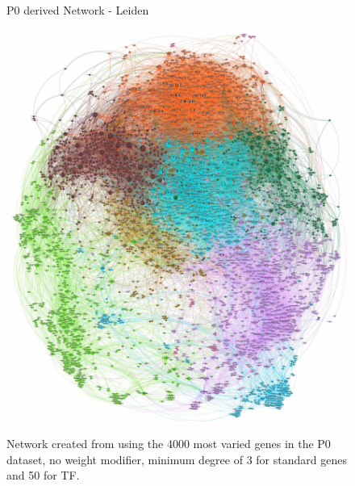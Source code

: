 \newpage
{}
\begin{figure}[p]
  \thispagestyle{empty} %
  \centering
  \captionsetup{justification=centering, labelfont=bf}
    \parbox{\textwidth}{\centering \Huge P0 derived Network - Leiden\vspace{0.5cm} } %
    \label{fig:N_I:tum_P0}
    \includegraphics[width=0.9\paperwidth,keepaspectratio]{Sections/Network_pages/images/p0_std_4K_50TF_lowRes.jpg} %
    \parbox{0.8\textwidth}{\centering Network created from using the 4000 most varied genes in the P0 dataset, no weight modifier, minimum degree of 3 for standard genes and 50 for TF.}
\end{figure}
\restoregeometry
\newpage
